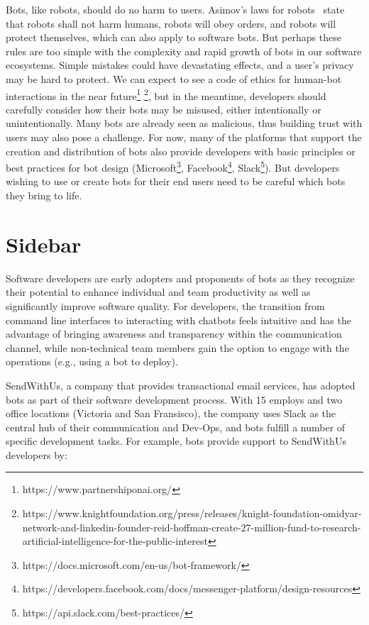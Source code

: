 \documentclass{sig-alternate}
\begin{document}
	Bots, like robots, should do no harm to users.  
	Asimov's laws for robots~\cite{asimov1950evitable} state that 
	robots shall not harm humans, robots will obey orders, and robots will protect themselves, which can also apply to software bots.
	But perhaps these rules are too simple with the complexity and rapid growth of bots in our software ecosystems.  Simple mistakes could have devastating effects, and a user's privacy may be hard to protect.  
	We can expect to see a code of ethics for human-bot interactions in the near future\footnote{https://www.partnershiponai.org/} \footnote{https://www.knightfoundation.org/press/releases/knight-foundation-omidyar-network-and-linkedin-founder-reid-hoffman-create-27-million-fund-to-research-artificial-intelligence-for-the-public-interest}, but in the meantime, developers should carefully consider how their bots may be misused, either intentionally or unintentionally. Many bots are already seen as malicious, thus building trust with users may also pose a challenge. 
	For now, many of the platforms that support the creation and distribution of bots also provide developers with basic principles or best practices for bot design (Microsoft\footnote{https://docs.microsoft.com/en-us/bot-framework/}, Facebook\footnote{https://developers.facebook.com/docs/messenger-platform/design-resources}, Slack\footnote{https://api.slack.com/best-practices/}).
	But developers wishing to use or create bots for their end users need to be careful which bots they bring to life.
	

\section*{Sidebar}

Software developers are early adopters and proponents of bots as they recognize their potential to enhance individual and team productivity as well as significantly improve software quality. For developers, the transition from command line interfaces to interacting with chatbots feels intuitive and has the advantage of bringing awareness and transparency within the communication channel, while non-technical team members gain the option to engage with the operations (e.g., using a bot to deploy).

SendWithUs, a company that provides transactional email services, has adopted bots as part of their software development process. With 15 employs and two office locations (Victoria and San Fransisco), the company uses Slack as the central hub of their communication and Dev-Ops, and bots fulfill a number of specific development tasks. For example, bots provide support to SendWithUs developers by:
\end{document}
